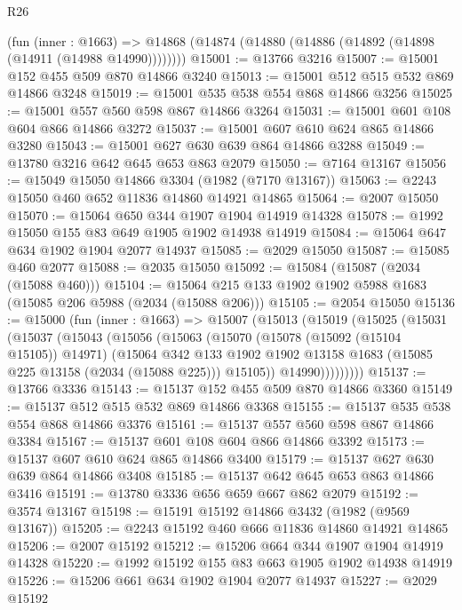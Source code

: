 \begin{lexlean}{R26}
\begin{coremodule}
    (fun (inner : @1663) =>
    @14868 (@14874 (@14880 (@14886 (@14892 (@14898 (@14911 (@14988 @14990))))))))
@15001 := @13766 @3216
@15007 := @15001 @152 @455 @509 @870 @14866 @3240
@15013 := @15001 @512 @515 @532 @869 @14866 @3248
@15019 := @15001 @535 @538 @554 @868 @14866 @3256
@15025 := @15001 @557 @560 @598 @867 @14866 @3264
@15031 := @15001 @601 @108 @604 @866 @14866 @3272
@15037 := @15001 @607 @610 @624 @865 @14866 @3280
@15043 := @15001 @627 @630 @639 @864 @14866 @3288
@15049 := @13780 @3216 @642 @645 @653 @863 @2079
@15050 := @7164 @13167
@15056 := @15049 @15050 @14866 @3304 (@1982 (@7170 @13167))
@15063 := @2243 @15050 @460 @652 @11836 @14860 @14921 @14865
@15064 := @2007 @15050
@15070 := @15064 @650 @344 @1907 @1904 @14919 @14328
@15078 := @1992 @15050 @155 @83 @649 @1905 @1902 @14938 @14919
@15084 := @15064 @647 @634 @1902 @1904 @2077 @14937
@15085 := @2029 @15050
@15087 := @15085 @460 @2077
@15088 := @2035 @15050
@15092 := @15084 (@15087 (@2034 (@15088 @460)))
@15104 := @15064 @215 @133 @1902 @1902 @5988 @1683 (@15085 @206 @5988 (@2034 (@15088 @206)))
@15105 := @2054 @15050
@15136 := @15000
    (fun (inner : @1663) =>
    @15007
      (@15013
        (@15019
          (@15025
            (@15031
              (@15037
                (@15043
                  (@15056
                    (@15063
                      (@15070
                        (@15078 (@15092 (@15104 @15105)) @14971)
                        (@15064
                          @342
                          @133
                          @1902
                          @1902
                          @13158
                          @1683
                          (@15085 @225 @13158 (@2034 (@15088 @225)))
                          @15105))
                      @14990)))))))))
@15137 := @13766 @3336
@15143 := @15137 @152 @455 @509 @870 @14866 @3360
@15149 := @15137 @512 @515 @532 @869 @14866 @3368
@15155 := @15137 @535 @538 @554 @868 @14866 @3376
@15161 := @15137 @557 @560 @598 @867 @14866 @3384
@15167 := @15137 @601 @108 @604 @866 @14866 @3392
@15173 := @15137 @607 @610 @624 @865 @14866 @3400
@15179 := @15137 @627 @630 @639 @864 @14866 @3408
@15185 := @15137 @642 @645 @653 @863 @14866 @3416
@15191 := @13780 @3336 @656 @659 @667 @862 @2079
@15192 := @3574 @13167
@15198 := @15191 @15192 @14866 @3432 (@1982 (@9569 @13167))
@15205 := @2243 @15192 @460 @666 @11836 @14860 @14921 @14865
@15206 := @2007 @15192
@15212 := @15206 @664 @344 @1907 @1904 @14919 @14328
@15220 := @1992 @15192 @155 @83 @663 @1905 @1902 @14938 @14919
@15226 := @15206 @661 @634 @1902 @1904 @2077 @14937
@15227 := @2029 @15192

\end{coremodule}
\end{lexlean}
